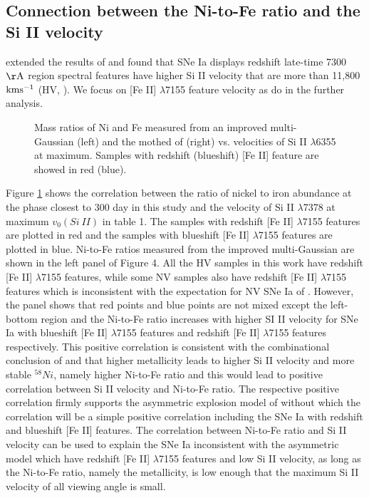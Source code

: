 \documentclass[twocolumn]{aastex631}
\begin{document}
\subsection{Connection between the Ni-to-Fe ratio and the Si II velocity \label{subsec:ratio_v}}

\citet{2013MNRAS.430.1030S} extended the results of \cite{2010ApJ...708.1703M} and found that SNe Ia displays redshift late-time 7300 $\rm \AA$ region spectral features have higher Si II velocity that are more than 11,800$\rm km s^{-1}$ (HV, \citealt{2009ApJ...699L.139W}). We focus on [Fe II] $\lambda$7155 feature velocity as \citet{2018MNRAS.477.3567M} do in the further analysis.

\begin{figure}[ht!]
\caption{Mass ratios of Ni and Fe measured from an improved multi-Gaussian (left) and the mothed of \citet{2020MNRAS.491.2902F} (right) vs.  velocities of Si II $\lambda$6355 at maximum. Samples with redshift (blueshift) [Fe II] feature are showed in red (blue).}
\label{fig:R_v_comp}
\end{figure}

Figure \ref{fig:R_v_comp} shows the correlation between the ratio of nickel to iron abundance at the phase closest to 300 day in this study and the velocity of Si II $\lambda$7378 at maximum $v_0(Si\ II)$ in table 1. The samples with redshift [Fe II] $\lambda$7155 features are plotted in red and the samples with blueshift [Fe II] $\lambda$7155 features are plotted in blue. Ni-to-Fe ratios measured from the improved multi-Gaussian are shown in the left panel of Figure 4. All the HV samples in this work have redshift [Fe II] $\lambda$7155 features, while some NV samples also have redshift [Fe II] $\lambda$7155 features which is inconsistent with the expectation for NV SNe Ia of \citet{2013MNRAS.430.1030S}. However, the panel shows that red points and blue points are not mixed except the left-bottom region and the Ni-to-Fe ratio increases with higher SI II velocity for SNe Ia with blueshift [Fe II] $\lambda$7155 features and redshift [Fe II] $\lambda$7155 features respectively. This positive correlation is consistent with the combinational conclusion of \citet{2000ApJ...530..966L} and \citet{2003ApJ...590L..83T} that higher metallicity leads to higher Si II velocity and more stable $^{58}Ni$, namely higher Ni-to-Fe ratio and this would lead to positive correlation between Si II velocity and Ni-to-Fe ratio. The respective positive correlation firmly supports the asymmetric explosion model of \citet{2010Natur.466...82M} without which the correlation will be a simple positive correlation including the SNe Ia with redshift and blueshift [Fe II] features. The correlation between Ni-to-Fe ratio and Si II velocity can be used to explain the SNe Ia inconsistent with the asymmetric model which have redshift [Fe II] $\lambda$7155 features and low Si II velocity, as long as the Ni-to-Fe ratio, namely the metallicity, is low enough that the maximum Si II velocity of all viewing angle is small.
\end{document}
